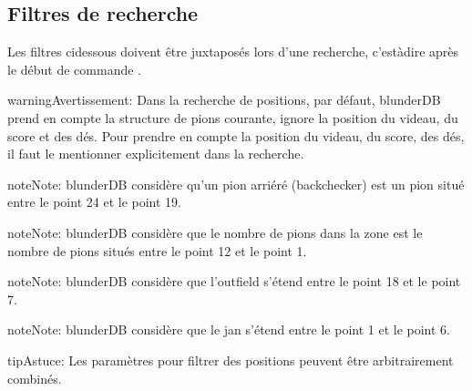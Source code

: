 \documentclass[letterpaper,10pt,french]{sphinxmanual}
\begin{document}
\subsection{Filtres de recherche}
\label{\detokenize{cmd_mode:filtres-de-recherche}}\label{\detokenize{cmd_mode:cmd-filter}}
\sphinxAtStartPar
Les filtres ci\sphinxhyphen{}dessous doivent être juxtaposés lors d’une recherche,
c’est\sphinxhyphen{}à\sphinxhyphen{}dire après le début de commande .

\label{\detokenize{cmd_mode:cmd-filter-pos}}
\begin{sphinxadmonition}{warning}{Avertissement:}
\sphinxAtStartPar
Dans la recherche de positions, par défaut, blunderDB prend en
compte la structure de pions courante, ignore la position du videau, du
score et des dés. Pour prendre en compte la position du videau, du score,
des dés, il faut le mentionner explicitement dans la recherche.
\end{sphinxadmonition}

\begin{sphinxadmonition}{note}{Note:}
\sphinxAtStartPar
blunderDB considère qu’un pion arriéré (backchecker) est un pion
situé entre le point 24 et le point 19.
\end{sphinxadmonition}

\begin{sphinxadmonition}{note}{Note:}
\sphinxAtStartPar
blunderDB considère que le nombre de pions dans la zone est le nombre
de pions situés entre le point 12 et le point 1.
\end{sphinxadmonition}

\begin{sphinxadmonition}{note}{Note:}
\sphinxAtStartPar
blunderDB considère que l’outfield s’étend entre le point 18 et le point 7.
\end{sphinxadmonition}

\begin{sphinxadmonition}{note}{Note:}
\sphinxAtStartPar
blunderDB considère que le jan s’étend entre le point 1 et le point 6.
\end{sphinxadmonition}

\begin{sphinxadmonition}{tip}{Astuce:}
\sphinxAtStartPar
Les paramètres pour filtrer des positions peuvent être arbitrairement
combinés.
\end{sphinxadmonition}
\end{document}
